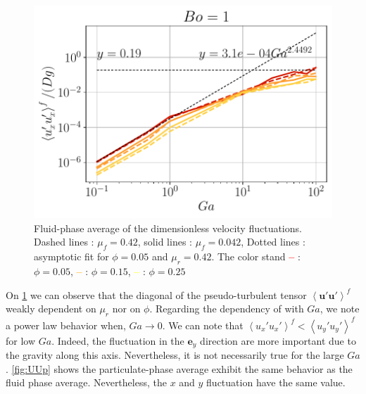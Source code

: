 \begin{figure}[h!]
    \includegraphics[height=0.20\textheight]{image/N_10/UU/UU_fxx_Bo_1.pdf}
    \caption{Fluid-phase average of the dimensionless velocity fluctuations. Dashed lines : $\mu_f = 0.42$, solid lines : $\mu_f = 0.042$, Dotted lines : asymptotic fit for $\phi = 0.05$ and $\mu_r = 0.42$. The color stand  \textcolor{red}{\textbf{--}} : $\phi = 0.05$, \textcolor{orange}{\textbf{--}} : $\phi = 0.15$, \textcolor{yellow}{\textbf{--}} : $\phi = 0.25$} 
    \label{fig:UUf}
\end{figure} 
On \ref{fig:UUf} we can observe that the diagonal of the pseudo-turbulent tensor $\left<\bm{u'u'}\right>^f$ weakly dependent on $\mu_r$ nor on $\phi$.
Regarding the dependency of  with $Ga$, we note a power law behavior when, $Ga \rightarrow 0$. 
We can note that $\left<{u_x'u_x'}\right>^f  < \left<{u_y'u_y'}\right>^f$ for low $Ga$.
Indeed, the fluctuation in the $\bm{e}_y$ direction are more important due to the gravity along this axis.  
Nevertheless, it is not necessarily true for the large $Ga$. 
\ref{fig:UUp} shows the particulate-phase average exhibit the same behavior as the fluid phase average. 
Nevertheless, the $x$ and $y$ fluctuation have the same value.
